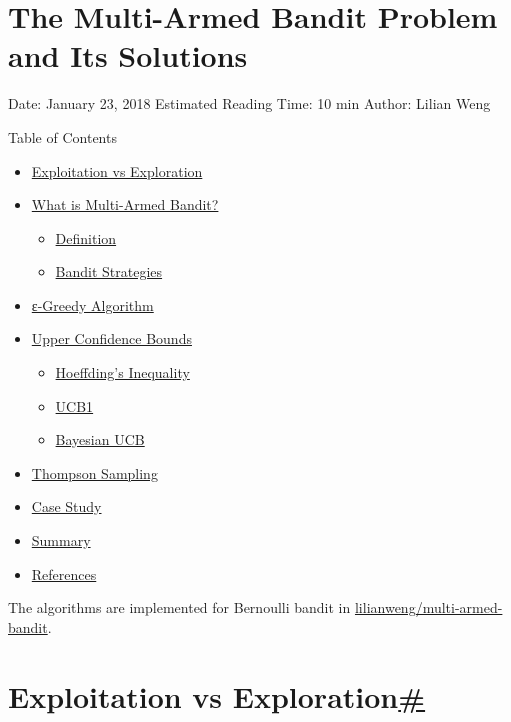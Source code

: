 \section{The Multi-Armed Bandit Problem and Its Solutions}\label{the-multi-armed-bandit-problem-and-its-solutions}

Date: January 23, 2018 \textbar{} Estimated Reading Time: 10 min \textbar{} Author: Lilian Weng

{Table of Contents}

\begin{itemize}
\tightlist
\item
  \hyperref[exploitation-vs-exploration]{Exploitation vs Exploration}
\item
  \hyperref[what-is-multi-armed-bandit]{What is Multi-Armed Bandit?}

  \begin{itemize}
  \tightlist
  \item
    \hyperref[definition]{Definition}
  \item
    \hyperref[bandit-strategies]{Bandit Strategies}
  \end{itemize}
\item
  \hyperref[ux5cux25ceux5cux25b5-greedy-algorithm]{ε-Greedy Algorithm}
\item
  \hyperref[upper-confidence-bounds]{Upper Confidence Bounds}

  \begin{itemize}
  \tightlist
  \item
    \hyperref[hoeffdings-inequality]{Hoeffding's Inequality}
  \item
    \hyperref[ucb1]{UCB1}
  \item
    \hyperref[bayesian-ucb]{Bayesian UCB}
  \end{itemize}
\item
  \hyperref[thompson-sampling]{Thompson Sampling}
\item
  \hyperref[case-study]{Case Study}
\item
  \hyperref[summary]{Summary}
\item
  \hyperref[references]{References}
\end{itemize}

The algorithms are implemented for Bernoulli bandit in \href{http://github.com/lilianweng/multi-armed-bandit}{lilianweng/multi-armed-bandit}.

\section{\texorpdfstring{Exploitation vs Exploration\hyperref[exploitation-vs-exploration]{\#}}{Exploitation vs Exploration\#}}\label{exploitation-vs-exploration}

